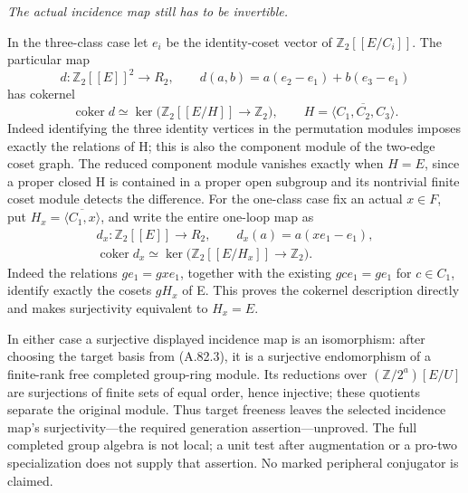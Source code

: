 \emph{The actual incidence map still has to be invertible.}\par
In the three-class case let \(e_i\) be the identity-coset
vector of \(\mathbb Z_2[[E/C_i]]\). The particular map
\[
 d:\mathbb Z_2[[E]]^2\longrightarrow R_2,
       \qquad d(a,b)=a(e_2-e_1)+b(e_3-e_1)
 \tag{A.82.10}
\]
has cokernel
\[
 \operatorname{coker}d\simeq
 \ker\bigl(\mathbb Z_2[[E/H]]\longrightarrow\mathbb Z_2\bigr),
       \qquad H=\overline{\langle C_1,C_2,C_3\rangle}.
 \tag{A.82.11}
\]
Indeed identifying the three identity vertices in the
permutation modules imposes exactly the relations of H;
this is also the component module of the two-edge coset
graph. The reduced component module vanishes exactly when
\(H=E\), since a proper closed H is contained in a proper
open subgroup and its nontrivial finite coset module detects
the difference. For the one-class case fix an actual \(x\in F\),
put \(H_x=\overline{\langle C_1,x\rangle}\), and
write the entire one-loop map as
\[
 \begin{gathered}
 d_x:\mathbb Z_2[[E]]\longrightarrow R_2,
       \qquad d_x(a)=a(xe_1-e_1),\\
 \operatorname{coker}d_x\simeq
 \ker\bigl(\mathbb Z_2[[E/H_x]]\longrightarrow\mathbb Z_2\bigr).
 \end{gathered}
 \tag{A.82.12}
\]
Indeed the relations \(ge_1=gxe_1\), together with the
existing \(gce_1=ge_1\) for \(c\in C_1\), identify
exactly the cosets \(gH_x\) of E. This proves the
cokernel description directly and makes surjectivity
equivalent to \(H_x=E\).

In either case a surjective displayed incidence map is
an isomorphism: after choosing the target basis from
(A.82.3), it is a surjective endomorphism of a finite-rank
free completed group-ring module. Its reductions over
\((\mathbb Z/2^a)[E/U]\) are surjections of finite
sets of equal order, hence injective; these quotients
separate the original module. Thus target freeness
leaves the selected incidence map's surjectivity---the
required generation assertion---unproved.
The full completed group algebra is not local; a unit test
after augmentation or a pro-two specialization does not
supply that assertion. No marked peripheral conjugator is
claimed.
